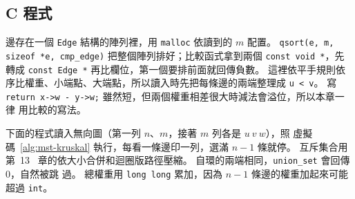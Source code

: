 \subsection{C 程式}

\begin{cbookrecap}
邊存在一個 \texttt{Edge} 結構的陣列裡，用 \texttt{malloc} 依讀到的 $m$ 配置。
\texttt{qsort(e, m, sizeof *e, cmp\_edge)} 把整個陣列排好；比較函式拿到兩個
\texttt{const void *}，先轉成 \texttt{const Edge *} 再比欄位，第一個要排前面就回傳負數。
這裡依平手規則依序比權重、小端點、大端點，所以讀入時先把每條邊的兩端整理成 \texttt{u <
v}。 寫 \texttt{return x->w - y->w;} 雖然短，但兩個權重相差很大時減法會溢位，所以本章一律
用比較的寫法。
\end{cbookrecap}

下面的程式讀入無向圖（第一列 $n$、$m$，接著 $m$ 列各是 $u\ v\ w$），照
虛擬碼~\ref{alg:mst-kruskal} 執行，每看一條邊印一列，選滿 $n - 1$ 條就停。 互斥集合用第~13~
章的依大小合併和迴圈版路徑壓縮。 自環的兩端相同，\texttt{union\_set} 會回傳 $0$，自然被跳
過。 總權重用 \texttt{long long} 累加，因為 $n - 1$ 條邊的權重加起來可能超過 \texttt{int}。

